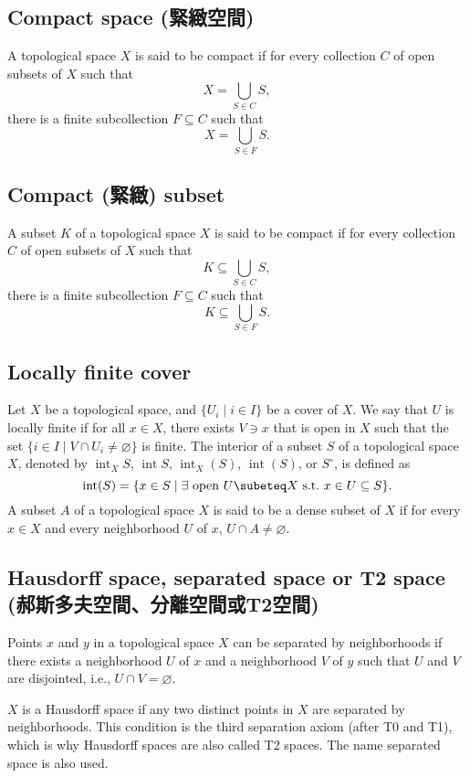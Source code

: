 \documentclass[a4paper,12pt]{article}
\begin{document}
\subsection{Compact space (緊緻空間)}
A topological space $X$ is said to be compact if for every collection $C$ of open subsets of $X$ such that
\[X=\bigcup_{S\in C}S,\]
there is a finite subcollection $F\subseteq C$ such that
\[X=\bigcup _{S\in F}S.\]
\subsection{Compact (緊緻) subset}
A subset $K$ of a topological space $X$ is said to be compact if for every collection $C$ of open subsets of $X$ such that
\[K\subseteq\bigcup_{S\in C}S,\]
there is a finite subcollection $F\subseteq C$ such that
\[K\subseteq\bigcup _{S\in F}S.\]
\subsection{Locally finite cover}
Let $X$ be a topological space, and $\{U_i\mid i\in I\}$ be a cover of $X$. We say that $U$ is locally finite if for all $x\in X$, there exists $V\ni x$ that is open in $X$ such that the set $\{i\in I\mid V\cap U_i\neq\varnothing\}$ is finite.
The interior of a subset $S$ of a topological space $X$, denoted by $\operatorname{int}_XS$, $\operatorname{int}S$, $\operatorname{int}_X(S)$, $\operatorname{int}(S)$, or $S^{\circ}$, is defined as
\[\operatorname{int}(S) = \{ x \in S \mid \exists \text{\ open\ } U\subeteq X \text{\ s.t.\ } x \in U \subseteq S \}.\]
A subset $A$ of a topological space $X$ is said to be a dense subset of $X$ if for every $x\in X$ and every neighborhood $U$ of $x$, $U\cap A\neq\varnothing$.
\subsection{Hausdorff space, separated space or T2 space (郝斯多夫空間、分離空間或T2空間)}
Points $x$ and $y$ in a topological space $X$ can be separated by neighborhoods if there exists a neighborhood $U$ of $x$ and a neighborhood $V$ of $y$ such that $U$ and $V$ are disjointed, i.e., $U\cap V=\varnothing$.

$X$ is a Hausdorff space if any two distinct points in $X$ are separated by neighborhoods. This condition is the third separation axiom (after T0 and T1), which is why Hausdorff spaces are also called T2 spaces. The name separated space is also used.
\end{document}
